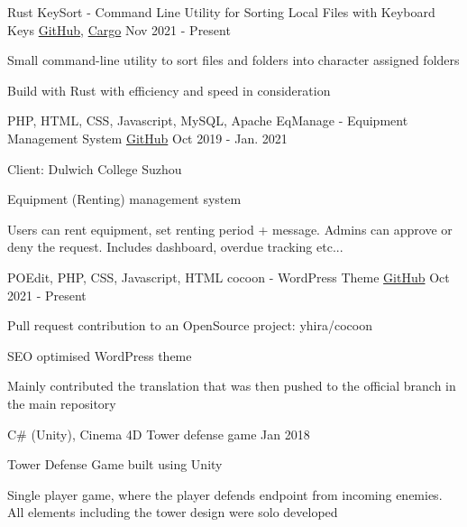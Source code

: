 \begin{cventries}
  \cventry
    {Rust} 
    {KeySort - Command Line Utility for Sorting Local Files with Keyboard Keys}
    {\href{https://github.com/UnciaBit/KeySort-cli}{GitHub}, \href{https://crates.io/crates/keysort}{Cargo}} %
    {Nov 2021 - Present}
    {
      \begin{cvitems}
        \item {Small command-line utility to sort files and folders into character assigned folders}
        \item {Build with Rust with efficiency and speed in consideration}
      \end{cvitems}
    }

  \cventry
    {PHP, HTML, CSS, Javascript, MySQL, Apache}
    {EqManage - Equipment Management System}
    {\href{https://github.com/YukiKume/EqManage}{GitHub}} %
    {Oct 2019 - Jan. 2021}
    {
      \begin{cvitems}
        \item {Client: Dulwich College Suzhou}
        \item {Equipment (Renting) management system}
        \item {Users can rent equipment, set renting period + message. Admins can approve or deny the request. Includes dashboard, overdue tracking etc...}
      \end{cvitems}
    }

  \cventry
  {POEdit, PHP, CSS, Javascript, HTML}
  {cocoon - WordPress Theme}
  {\href{https://github.com/WrenHainsworth/cocoon}{GitHub}} %
  {Oct 2021 - Present}
  {
    \begin{cvitems}
      \item {Pull request contribution to an OpenSource project: yhira/cocoon}
      \item {SEO optimised WordPress theme}
      \item {Mainly contributed the translation that was then pushed to the official branch in the main repository}
    \end{cvitems}
  }

  \cventry
  {C\# (Unity), Cinema 4D}
  {Tower defense game}
  {} %
  {Jan 2018}
  {
    \begin{cvitems}
      \item {Tower Defense Game built using Unity}
      \item {Single player game, where the player defends endpoint from incoming enemies. All elements including the tower design were solo developed}
    \end{cvitems}
  }


\end{cventries}
